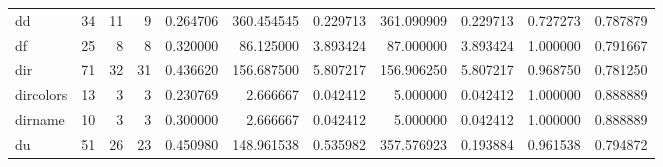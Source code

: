 \begin{longtable}{lrrrrrrrrrr}
dd        &                                      34 &                 11 &                                 9 &                                   0.264706 &                             360.454545 &                                     0.229713 &                        361.090909 &                                0.229713 &                           0.727273 &                                           0.787879 \\
df        &                                      25 &                  8 &                                 8 &                                   0.320000 &                              86.125000 &                                     3.893424 &                         87.000000 &                                3.893424 &                           1.000000 &                                           0.791667 \\
dir       &                                      71 &                 32 &                                31 &                                   0.436620 &                             156.687500 &                                     5.807217 &                        156.906250 &                                5.807217 &                           0.968750 &                                           0.781250 \\
dircolors &                                      13 &                  3 &                                 3 &                                   0.230769 &                               2.666667 &                                     0.042412 &                          5.000000 &                                0.042412 &                           1.000000 &                                           0.888889 \\
dirname   &                                      10 &                  3 &                                 3 &                                   0.300000 &                               2.666667 &                                     0.042412 &                          5.000000 &                                0.042412 &                           1.000000 &                                           0.888889 \\
du        &                                      51 &                 26 &                                23 &                                   0.450980 &                             148.961538 &                                     0.535982 &                        357.576923 &                                0.193884 &                           0.961538 &                                           0.794872 \\

\end{longtable}
